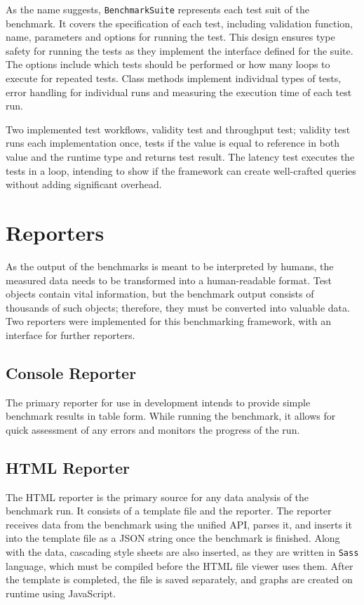 As the name suggests, \texttt{BenchmarkSuite} represents each test suit of the
benchmark. It covers the specification of each test, including validation
function, name, parameters and options for running the test. This design ensures
type safety for running the tests as they implement the interface defined for
the suite. The options include which tests should be performed or how many loops
to execute for repeated tests. Class methods implement individual types of
tests, error handling for individual runs and measuring the execution time of
each test run.

Two implemented test workflows, validity test and throughput test; validity test
runs each implementation once, tests if the value is equal to reference in both
value and the runtime type and returns test result. The latency test executes
the tests in a loop, intending to show if the framework can create well-crafted
queries without adding significant overhead.

\section{Reporters}
As the output of the benchmarks is meant to be interpreted by humans, the
measured data needs to be transformed into a human-readable format.
Test objects contain vital information, but the benchmark output consists of
thousands of such objects; therefore, they must be converted into valuable data.
Two reporters were implemented for this benchmarking framework, with an
interface for further reporters.

\subsection{Console Reporter}
The primary reporter for use in development intends to provide simple benchmark
results in table form. While running the benchmark, it allows for quick
assessment of any errors and monitors the progress of the run.

\subsection{HTML Reporter}
The HTML reporter is the primary source for any data analysis of the benchmark
run. It consists of a template file and the reporter. The reporter receives data
from the benchmark using the unified API, parses it, and inserts it into the
template file as a JSON string once the benchmark is finished. Along with the
data, cascading style sheets are also inserted, as they are written in
\texttt{Sass} language, which must be compiled before the HTML file viewer uses
them. After the template is completed, the file is saved separately, and graphs
are created on runtime using JavaScript.


